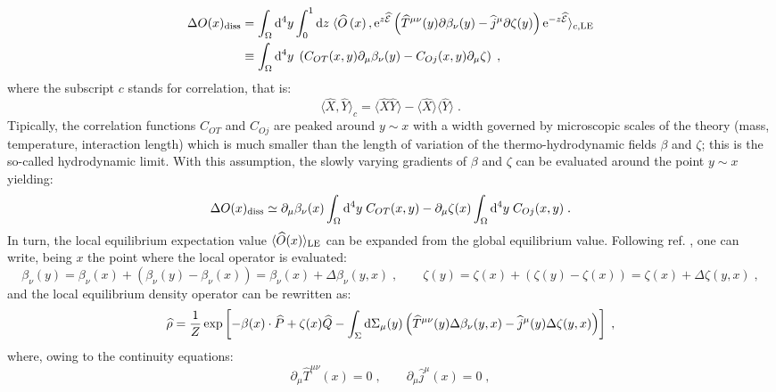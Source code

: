 \documentclass[prd,superscriptaddress,nofootinbib,notitlepage]{revtex4-1}
\def\wT{{\widehat T}}
\def\wj{{\widehat j}}
\def\wP{{\widehat P}}
\def\wQ{{\widehat Q}}
\def\wE{{\widehat{\cal E}}}
\def\wrho{{\widehat{\rho}}}
\def\wO{\widehat O}
\def\wQ{\widehat Q}
\def\wX{\widehat X}
\def\wY{\widehat Y}
\newcommand{\e}{{\rm e}}
\newcommand{\di}{{\rm d}}
\newcommand{\be}{\begin{equation}}
\newcommand{\ee}{\end{equation}}
\begin{document}
%
\begin{equation}\label{traditional}
    \begin{split}
 \Delta O(x)_{\rm diss} &= \int_{\Omega} \di^4 y \int^1_0\di z \; 
 \langle\wO\left(x\right), \e^{z\wE} \left(\wT^{\mu\nu}(y)\partial\beta_\nu(y)-
 \wj^\mu\partial\zeta(y)\right)\e^{-z\wE}\rangle_{c, \mathrm{LE}}\\
 & \equiv \int_{\Omega} \di^4 y \; \left( C_{OT}(x,y)\partial_\mu\beta_\nu(y) - C_{Oj}(x,y)\partial_\mu \zeta \right)
 \;,
\end{split}
\end{equation}
%
where the subscript $c$ stands for correlation, that is:
%
$$
   \langle \wX, \wY\rangle_c= \langle \wX \wY \rangle - \langle \wX \rangle \langle \wY \rangle\;.
$$
%
Tipically, the correlation functions $C_{OT}$ and $C_{Oj}$ are peaked around $y \sim x$ with a width
governed by microscopic scales of the theory (mass, temperature, interaction length) which is much smaller 
than the length of variation of the thermo-hydrodynamic fields $\beta$ and $\zeta$; this is the so-called hydrodynamic 
limit. With this assumption, the slowly varying gradients of $\beta$ and $\zeta$ can be evaluated around the point 
$y \sim x$ yielding:
%
\be\label{traditional2}
 \Delta O(x)_{\rm diss} \simeq \partial_\mu\beta_\nu(x) 
  \int_{\Omega} \di^4 y \; C_{OT}(x,y) - \partial_\mu\zeta(x) \int_{\Omega} \di^4 y \; C_{Oj}(x,y) \;.
\ee
%
In turn, the local equilibrium expectation value $\langle \wO(x) \rangle_{\rm LE}$ can be expanded from the global 
equilibrium value. Following ref. \cite{Sheng:2025cjk}, one can write, being $x$ the point where the local operator is
evaluated:
%
\begin{equation}\label{deltabeta}
    \beta_\nu(y) = \beta_\nu(x) + (\beta_\nu(y) - \beta_\nu(x)) = \beta_\nu(x) + \Delta\beta_\nu(y,x)\;,
    \qquad  \zeta(y) = \zeta(x) + (\zeta(y)-\zeta(x)) = \zeta(x) + \Delta\zeta(y,x)\;,
\end{equation}
%
and the local equilibrium density operator can be rewritten as:
%
\begin{equation}\label{densop2}
    \wrho =\frac{1}{Z}\exp\left[-\beta(x) \cdot \wP + \zeta(x) \wQ - \int_{\Sigma}\di\Sigma_\mu(y)
    \left(\wT^{\mu\nu}(y) \Delta\beta_\nu(y,x)-\wj^\mu(y)\Delta\zeta(y,x)\right)\right]\;,
\end{equation}
%
where, owing to the continuity equations:
%
\begin{equation}\label{conservation}
    \partial_\mu\wT^{\mu\nu}(x)=0\;,\qquad \partial_\mu\wj^\mu(x)=0\;,
\end{equation}
\end{document}
